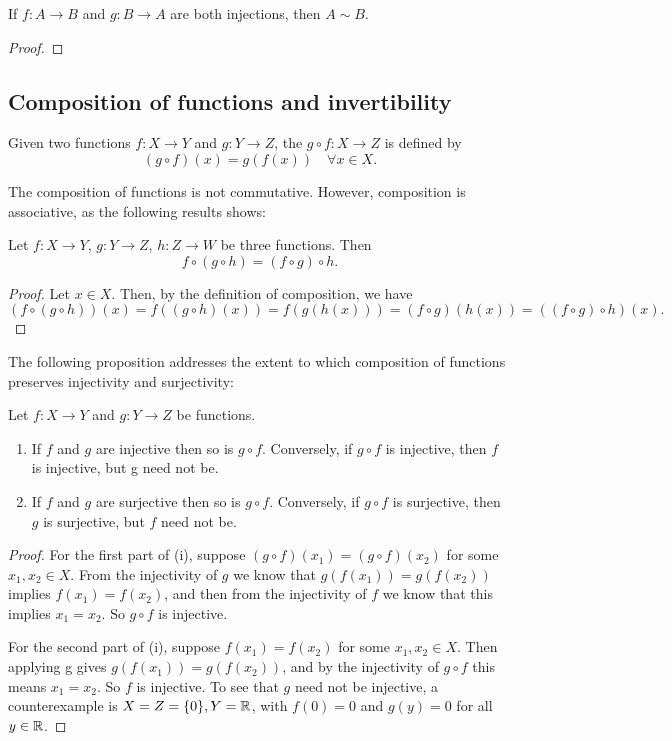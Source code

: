 \begin{theorem}
If $f:A\to B$ and $g:B\to A$ are both injections, then $A\sim B$.
\end{theorem}

\begin{proof}
\end{proof}
\pagebreak

\subsection{Composition of functions and invertibility}
\begin{definition}
Given two functions $f:X\to Y$ and $g:Y\to Z$, the  $g\circ f:X\to Z$ is defined by
\[ (g \circ f)(x) = g(f(x)) \quad \forall x \in X. \]
\end{definition}

The composition of functions is not commutative. However, composition is associative, as the following results shows:

\begin{proposition}[Associativity]
Let $f:X\to Y$, $g:Y\to Z$, $h:Z\to W$ be three functions. Then
\[ f \circ (g \circ h) = (f \circ g) \circ h. \]
\end{proposition}

\begin{proof}
Let $x \in X$. Then, by the definition of composition, we have
\[ (f \circ (g \circ h))(x) = f((g \circ h)(x)) = f(g(h(x))) = (f \circ g)(h(x)) = ((f \circ g) \circ h)(x). \]
\end{proof}

The following proposition addresses the extent to which composition of functions preserves injectivity and surjectivity:
\begin{proposition}
Let $f:X\to Y$ and $g:Y\to Z$ be functions.
\begin{enumerate}[label=(\roman*)]
\item If $f$ and $g$ are injective then so is $g \circ f$. Conversely, if $g \circ f$ is injective, then $f$ is injective, but g need not be.
\item If $f$ and $g$ are surjective then so is $g \circ f$. Conversely, if $g \circ f$ is surjective, then $g$ is surjective, but $f$ need not be.
\end{enumerate}
\end{proposition}
\begin{proof}
For the first part of (i), suppose $(g \circ f)(x_1) = (g \circ f)(x_2)$ for some $x_1, x_2 \in X$. From the injectivity of $g$ we know that $g(f(x_1)) = g(f(x_2))$ implies $f(x_1) = f(x_2)$, and then from the injectivity of $f$ we know that this implies $x_1 = x_2$. So $g \circ f$ is injective.

For the second part of (i), suppose $f(x_1) = f(x_2)$ for some $x_1, x_2 \in X$. Then applying g gives $g(f(x_1)) = g(f(x_2))$, and by the injectivity of $g \circ f$ this means $x_1 = x_2$. So $f$ is injective. To see that $g$ need not be injective, a counterexample is $X = Z = \{0\}, Y = \mathbb R$, with $f(0) = 0$ and $g(y) = 0$ for all $y \in \mathbb R$.
\end{proof}

